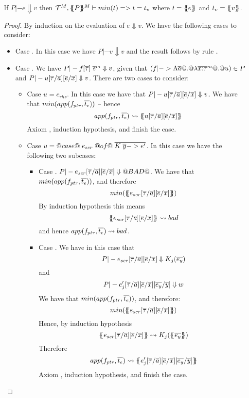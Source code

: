 \documentclass[preprint]{sigplanconf}
\begin{document}
\begin{lemma}\label{lem:guarded-eval}
If $P |- e \Downarrow v$ then ${\cal T}^M, \{\!\!\{P\}\!\!\}^M \vdash min(t) => t = t_v$
where $t = \{\!\!\{{e}\}\!\!\}$ and $t_v = \{\!\!\{{v}\}\!\!\}$.
\end{lemma}
\begin{proof} 
By induction on the evaluation of $e \Downarrow v$. We have the following
cases to consider:
\begin{itemize}
  \item Case . In this case we have $P |- v \Downarrow v$ and the result follows by rule .
  \item Case . We have $P |- f[\overline{\tau}]\;\overline{e}^{m} \Downarrow v$, given that 
         $(f |-> \Lambda\overline{a} @.@ \lambda\overline{x{:}\tau}^{m} @.@ u) \in P$ and 
         $P |- u[\overline{\tau}/\overline{a}][\overline{e}/\overline{x}] \Downarrow v$. There are two cases to consider:
    \begin{itemize}
       \item Case $u = e_{rhs}$. In this case we have that $P |- u[\overline{\tau}/\overline{a}][\overline{e}/\overline{x}] \Downarrow v$.
       We have that $min(app(f_{ptr},\overline{t_e}))$ -- hence 
         \[ app(f_{ptr},\overline{t_e}) \rightsquigarrow \{\!\!\{{u[\overline{\tau}/\overline{a}][\overline{e}/\overline{x}]}\}\!\!\} \] 
       Axiom , induction hypothesis, and  finish the case.

       \item Case $u = @case@\;e_{scr}\;@of@\;\overline{K\;\overline{y} -> e'}$. In this case we have the following two subcases:
       \begin{itemize}
         \item Case . $P |- e_{scr}[\overline{\tau}/\overline{a}][\overline{e}/\overline{x}] \Downarrow @BAD@$.
               We have that $min(app(f_{ptr},\overline{t_e}))$, and therefore 
                    \[ min(\{\!\!\{{e_{scr}[\overline{\tau}/\overline{a}][\overline{e}/\overline{x}]}\}\!\!\}) \]
               By induction hypothesis this means 
                 \[ \{\!\!\{{e_{scr}[\overline{\tau}/\overline{a}][\overline{e}/\overline{x}]}\}\!\!\} \rightsquigarrow \mathop{bad} \] 
               and hence $app(f_{ptr},\overline{t_e}) \rightsquigarrow \mathop{bad}$.
         \item Case . We have in this case that 
                \[ P |- e_{scr}[\overline{\tau}/\overline{a}][\overline{e}/\overline{x}] \Downarrow K_j(\overline{e_y}) \] and 
                 \[ P |- e'_j[\overline{\tau}/\overline{a}][\overline{e}/\overline{x}][\overline{e_y}/\overline{y}] \Downarrow w \]
               We have that $min(app(f_{ptr},\overline{t_e}))$, 
               and therefore:
               \[ min(\{\!\!\{{e_{scr}[\overline{\tau}/\overline{a}][\overline{e}/\overline{x}]}\}\!\!\}) \] 
               Hence, by induction hypothesis 
                     \[ \etrans{}{}{e_{scr}[\ol{\tau}/\ol{a}][\ol{e}/\ol{x}]} \red K_j(\etrans{}{}{\ol{e_y}}) \]
               Therefore 
                     \[ app(f_{ptr},\overline{t_e}) \rightsquigarrow \{\!\!\{{e'_j[\overline{\tau}/\overline{a}][\overline{e}/\overline{x}][\overline{e_y}/\overline{y}]}\}\!\!\} \]
               Axiom , induction hypothesis, and  finish the case.
       \end{itemize}


\end{itemize}
\end{itemize}
\end{proof}
\end{document}
